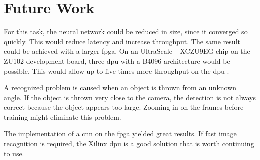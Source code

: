 \section{Future Work}
\label{sec:conclusion:future_work}
For this task, the neural network could be reduced in size, since it converged so quickly.
This would reduce latency and increase throughput.
The same result could be achieved with a larger \acrshort{fpga}.
On an UltraScale+ XCZU9EG chip on the ZU102 development board, three \acrshort{dpu}  with a B4096 architecture would be possible.
This would allow up to five times more throughput on the \acrshort{dpu} \cite{dpu_product_guide}.

A recognized problem is caused when an object is thrown from an unknown angle.
If the object is thrown very close to the camera, the detection is not always correct because the object appears too large.
Zooming in on the frames before training might eliminate this problem.

The implementation of a \acrlong{cnn} on the \acrshort{fpga} yielded great results.
If fast image recognition is required, the Xilinx \acrshort{dpu} is a good solution that is worth continuing to use.
